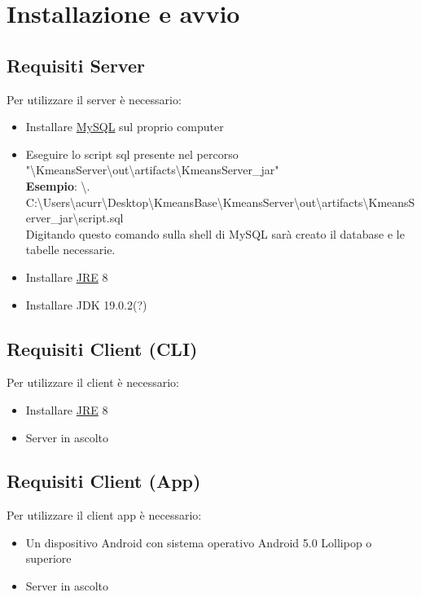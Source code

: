 \section{Installazione e avvio}
\subsection{Requisiti Server}
\noindent Per utilizzare il server è necessario:
\begin{itemize}[label=-]
  \item Installare \href{https://dev.mysql.com/downloads/installer/}{MySQL} sul proprio computer
  \item Eseguire lo script sql presente nel percorso "\textbackslash KmeansServer\textbackslash out\textbackslash artifacts\textbackslash KmeansServer\_jar"
  \\ \textbf{Esempio}: \textbackslash . C:\textbackslash Users\textbackslash acurr\textbackslash Desktop\textbackslash KmeansBase\textbackslash KmeansServer\textbackslash out\textbackslash artifacts\textbackslash KmeansServer\_jar\textbackslash script.sql
  \\ Digitando questo comando sulla shell di MySQL sarà creato il database e le tabelle necessarie.
  \item Installare \href{https://www.oracle.com/technetwork/java/javase/downloads/jre8-downloads-2133155.html}{JRE} 8
  \item Installare JDK 19.0.2(?)
\end{itemize}

\subsection{Requisiti Client (CLI)}
\noindent Per utilizzare il client è necessario:
\begin{itemize}[label=-]
  \item Installare \href{https://www.oracle.com/technetwork/java/javase/downloads/jre8-downloads-2133155.html}{JRE} 8  
  \item Server in ascolto
\end{itemize}

\subsection{Requisiti Client (App)}
\noindent Per utilizzare il client app è necessario:
\begin{itemize}[label=-]
  \item Un dispositivo Android con sistema operativo Android 5.0 Lollipop o superiore
  \item Server in ascolto
\end{itemize}


